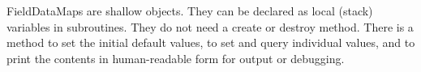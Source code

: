 

FieldDataMaps are shallow objects.  They can be declared
as local (stack) variables in subroutines.  They do not
need a create or destroy method.  There is a method to
set the initial default values, to set and query individual
values, and to print the contents in human-readable form
for output or debugging.

